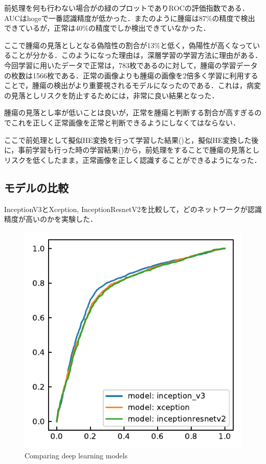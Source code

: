 前処理を何も行わない場合がの緑のプロットでありROCの評価指数である．AUCはhogeで一番認識精度が低かった．またのように腫瘍は87\%の精度で検出できているが，正常は40\%の精度でしか検出できていなかった．

ここで腫瘍の見落としとなる偽陰性の割合が13\%と低く，偽陽性が高くなっていることが分かる．このようになった理由は，深層学習の学習方法に理由がある．今回学習に用いたデータで正常は，783枚であるのに対して，腫瘍の学習データの枚数は1566枚である．正常の画像よりも腫瘍の画像を2倍多く学習に利用することで，腫瘍の検出がより重要視されるモデルになったのである．これは，病変の見落としリスクを防止するためには，非常に良い結果となった．

腫瘍の見落とし率が低いことは良いが，正常を腫瘍と判断する割合が高すぎるのでこれを正しく正常画像を正常と判断できるようにしなくてはならない．

ここで前処理として擬似HE変換を行って学習した結果()と，擬似HE変換した後に，事前学習も行った時の学習結果()から，前処理をすることで腫瘍の見落としリスクを低くしたまま，正常画像を正しく認識することができるようになった．

\subsection*{モデルの比較}
InceptionV3とXception, InceptionResnetV2を比較して，どのネットワークが認識精度が高いのかを実験した．

\begin{figure}
	\centering
	\includegraphics[width=0.7\linewidth]{fig/chapter4/2dcnn_model}
	\caption{Comparing deep learning models}
	\label{fig:2dcnnmodel}
\end{figure}

